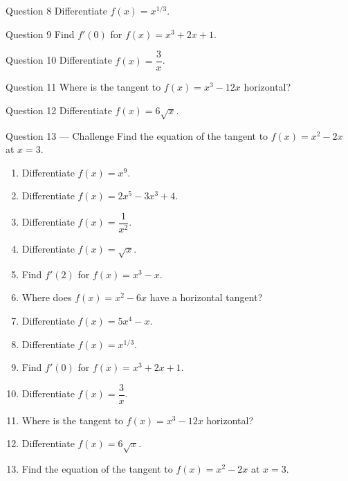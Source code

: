 \documentclass[11pt]{article}
\begin{document}
\begin{qbox}{Question 8}
Differentiate $f(x)=x^{1/3}$.\workspace{2.4cm}
\end{qbox}

\begin{qbox}{Question 9}
Find $f'(0)$ for $f(x)=x^3+2x+1$.\workspace{2.4cm}
\end{qbox}

\begin{qbox}{Question 10}
Differentiate $f(x)=\dfrac3{x}$.\workspace{2.4cm}
\end{qbox}

\begin{qbox}{Question 11}
Where is the tangent to $f(x)=x^3-12x$ horizontal?\workspace{2.4cm}
\end{qbox}

\begin{qbox}{Question 12}
Differentiate $f(x)=6\sqrt{x}$.\workspace{2.4cm}
\end{qbox}

\begin{qbox}{Question 13 --- Challenge}
Find the equation of the tangent to $f(x)=x^2-2x$ at $x=3$.\workspace{3cm}
\end{qbox}

\clearpage
{}

\begin{recapbox}
\begin{multicols}{2}
\small
\begin{enumerate}[leftmargin=*,itemsep=3pt]
  \item Differentiate $f(x)=x^9$.
  \item Differentiate $f(x)=2x^5-3x^3+4$.
  \item Differentiate $f(x)=\dfrac1{x^2}$.
  \item Differentiate $f(x)=\sqrt{x}$.
  \item Find $f'(2)$ for $f(x)=x^3-x$.
  \item Where does $f(x)=x^2-6x$ have a horizontal tangent?
  \item Differentiate $f(x)=5x^4-x$.
  \item Differentiate $f(x)=x^{1/3}$.
  \item Find $f'(0)$ for $f(x)=x^3+2x+1$.
  \item Differentiate $f(x)=\dfrac3{x}$.
  \item Where is the tangent to $f(x)=x^3-12x$ horizontal?
  \item Differentiate $f(x)=6\sqrt{x}$.
  \item Find the equation of the tangent to $f(x)=x^2-2x$ at $x=3$.
\end{enumerate}
\end{multicols}
\end{recapbox}
\end{document}
